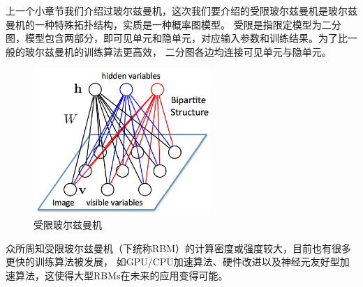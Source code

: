 \documentclass[12pt,a4paper,UTF8]{ctexart}
\begin{document}
上一个小章节我们介绍过玻尔兹曼机，这次我们要介绍的受限玻尔兹曼机是玻尔兹曼机的一种特殊拓扑结构，实质是一种概率图模型。
受限是指限定模型为二分图，模型包含两部分，即可见单元和隐单元，对应输入参数和训练结果。为了比一般的玻尔兹曼机的训练算法更高效，
二分图各边均连接可见单元与隐单元。
\begin{figure}[htpb]
     \centering
     \includegraphics[width=0.6\textwidth]{allpicture/f5dt7-uxdal.eps}
     \caption{受限玻尔兹曼机}
     \label{fig:受限玻尔兹曼机}
\end{figure}
众所周知受限玻尔兹曼机（下统称RBM）的计算密度或强度较大，目前也有很多更快的训练算法被发展，
如GPU/CPU加速算法、硬件改进以及神经元友好型加速算法，这使得大型RBMs在未来的应用变得可能。
\end{document}

